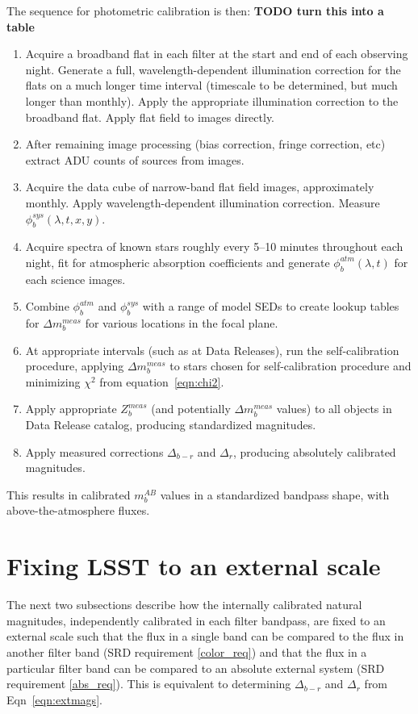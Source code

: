 \documentclass[12pt,preprint]{aastex}
\begin{document}
The sequence for photometric calibration is then:
{\bf TODO turn this into a table}
\begin{enumerate}
\item{Acquire a broadband flat in each filter at the start and end
of each observing night. Generate a full, wavelength-dependent
illumination correction for the flats on a much longer time interval
(timescale to be determined, but much longer than monthly). Apply
the appropriate illumination correction to the broadband flat. Apply
flat field to images directly.}
\item{After remaining image processing (bias correction, fringe
correction, etc) extract ADU counts of sources from images. }
\item{Acquire the data cube of narrow-band flat field images,
approximately monthly. Apply wavelength-dependent illumination
correction. Measure $\phi_b^{sys}(\lambda,t,x,y)$. }
\item{Acquire spectra of known stars roughly every 5--10 minutes
throughout each night, fit for atmospheric absorption coefficients and
generate $\phi_b^{atm}(\lambda,t)$ for each science images. }
\item{Combine $\phi_b^{atm}$ and $\phi_b^{sys}$ with a range of model
SEDs to create lookup tables for $\Delta m_b^{meas}$ for various
locations in the focal plane. }
\item{At appropriate intervals (such as at Data Releases), run the
self-calibration procedure, applying $\Delta m_b^{meas}$ to stars
chosen for self-calibration procedure and minimizing $\chi^2$ from
equation~\ref{eqn:chi2}.}
\item{Apply appropriate $Z_b^{meas}$ (and potentially $\Delta
m_b^{meas}$ values) to all objects in Data Release catalog, producing
standardized magnitudes.}
\item{Apply measured corrections $\Delta_{b-r}$ and $\Delta_r$,
producing absolutely calibrated magnitudes.}
\end{enumerate}
This results in calibrated $m_b^{AB}$ values in a standardized
bandpass shape, with above-the-atmosphere fluxes.

\section{Fixing LSST to an external scale}
\label{sec:calib_external}

The next two subsections describe how the internally calibrated
natural magnitudes, independently calibrated in each filter bandpass, are fixed
to an external scale such that the flux in a single band can be compared to the
flux in another filter band (SRD requirement \ref{color_req}) and that
the flux in a particular filter band can be compared to an absolute
external system (SRD requirement \ref{abs_req}). This is equivalent to
determining $\Delta_{b-r}$ and $\Delta_r$ from Eqn~\ref{eqn:extmags}. 
\end{document}
